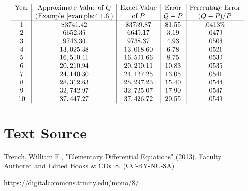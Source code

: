 \documentclass{ximera}
\begin{document}
$$
\begin{array}{c|c|c|c|c}
\text{Year} & \text{Approximate Value of } Q & \text{Exact Value} & \text{Error} & \text{Percentage
Error}\\
& \text{(Example~\ref{example:4.1.6})} & \text{of } P
& Q-P &
(Q-P)/P\\
\hline
  1 & \$ 3741.42 & \$ 3739.87 & \$ 1.55 &.0413 \% \\
  2 &   6652.36 &  6649.17 & 3.19 &.0479\\
  3 & 9743.30 &9738.37 &4.93 &.0506\\
  4 &  13,025.38 &  13,018.60 &6.78 & .0521\\
  5 &  16,510.41 &  16,501.66 & 8.75 &.0530 \\
  6 &  20,210.94 &  20,200.11 & 10.83 & .0536\\
  7 &  24,140.30 &  24,127.25 & 13.05 &.0541 \\
  8 &  28,312.63 &  28,297.23 & 15.40 &.0544 \\
  9 &  32,742.97 &  32,725.07 & 17.90 & .0547 \\
 10 &  37,447.27 &  37,426.72 & 20.55 & .0549 
 \end{array}
$$


\section*{Text Source}
Trench, William F., "Elementary Differential Equations" (2013). Faculty Authored and Edited Books \& CDs. 8. (CC-BY-NC-SA)

\href{https://digitalcommons.trinity.edu/mono/8/}{https://digitalcommons.trinity.edu/mono/8/}
\end{document}
